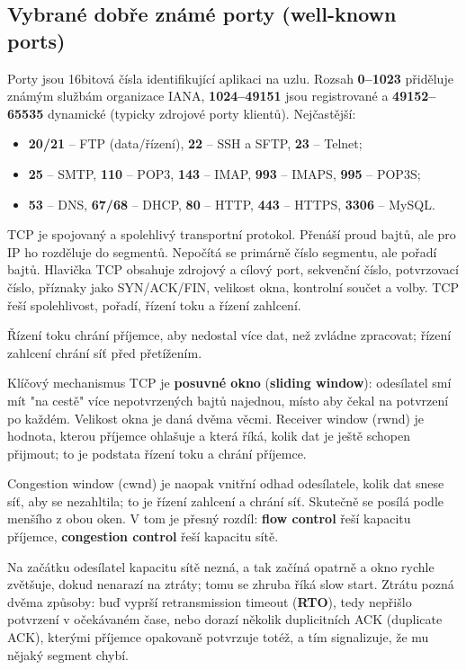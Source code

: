 \subsection*{Vybrané dobře známé porty (well-known ports)}
Porty jsou 16bitová čísla identifikující aplikaci na uzlu. Rozsah \textbf{0--1023} přiděluje známým službám organizace IANA, \textbf{1024--49151} jsou registrované a \textbf{49152--65535} dynamické (typicky zdrojové porty klientů). Nejčastější:
\begin{itemize}
  \item \textbf{20/21} -- FTP (data/řízení), \textbf{22} -- SSH a SFTP, \textbf{23} -- Telnet;
  \item \textbf{25} -- SMTP, \textbf{110} -- POP3, \textbf{143} -- IMAP, \textbf{993} -- IMAPS, \textbf{995} -- POP3S;
  \item \textbf{53} -- DNS, \textbf{67/68} -- DHCP, \textbf{80} -- HTTP, \textbf{443} -- HTTPS, \textbf{3306} -- MySQL.
\end{itemize}


TCP je spojovaný a spolehlivý transportní protokol. Přenáší proud bajtů, ale pro IP ho rozděluje do segmentů. Nepočítá se primárně číslo segmentu, ale pořadí bajtů. Hlavička TCP obsahuje zdrojový a cílový port, sekvenční číslo, potvrzovací číslo, příznaky jako SYN/ACK/FIN, velikost okna, kontrolní součet a volby. TCP řeší spolehlivost, pořadí, řízení toku a řízení zahlcení.

Řízení toku chrání příjemce, aby nedostal více dat, než zvládne zpracovat; řízení zahlcení chrání síť před přetížením.

Klíčový mechanismus TCP je \textbf{posuvné okno} (\textbf{sliding window}): odesílatel smí mít "na cestě" více nepotvrzených bajtů najednou, místo aby čekal na potvrzení po každém. Velikost okna je daná dvěma věcmi. Receiver window (rwnd) je hodnota, kterou příjemce ohlašuje a která říká, kolik dat je ještě schopen přijmout; to je podstata řízení toku a chrání příjemce.

Congestion window (cwnd) je naopak vnitřní odhad odesílatele, kolik dat snese síť, aby se nezahltila; to je řízení zahlcení a chrání síť. Skutečně se posílá podle menšího z obou oken. V tom je přesný rozdíl: \textbf{flow control} řeší kapacitu příjemce, \textbf{congestion control} řeší kapacitu sítě.

Na začátku odesílatel kapacitu sítě nezná, a tak začíná opatrně a okno rychle zvětšuje, dokud nenarazí na ztráty; tomu se zhruba říká slow start. Ztrátu pozná dvěma způsoby: buď vyprší retransmission timeout (\textbf{RTO}), tedy nepřišlo potvrzení v očekávaném čase, nebo dorazí několik duplicitních ACK (duplicate ACK), kterými příjemce opakovaně potvrzuje totéž, a tím signalizuje, že mu nějaký segment chybí.

